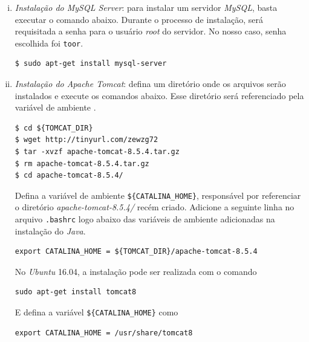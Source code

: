 \begin {enumerate}[i.]
\begin{lstlisting}[keywordstyle=\ttfamily, style=nonumbers]
export JAVA_HOME=/usr/lib/jvm/java-8-openjdk-amd64
export JRE_HOME=${JAVA_HOME}/jre
\end{lstlisting}

\item \textit{Instalação do MySQL Server}: para instalar um servidor
\textit{MySQL}, basta executar o comando abaixo. Durante o processo de
instalação, será requisitada a senha para o usuário \textit{root} do servidor.
No nosso caso, senha escolhida foi \texttt{toor}.
\begin{lstlisting}[keywordstyle=\ttfamily, style=nonumbers]
$ sudo apt-get install mysql-server
\end{lstlisting}


\item \textit{Instalação do Apache Tomcat}: defina um diretório onde os arquivos
serão instalados e execute os comandos abaixo. Esse diretório será referenciado
pela variável de ambiente .

\begin{lstlisting}[keywordstyle=\ttfamily, style=nonumbers]
$ cd ${TOMCAT_DIR}
$ wget http://tinyurl.com/zewzg72
$ tar -xvzf apache-tomcat-8.5.4.tar.gz
$ rm apache-tomcat-8.5.4.tar.gz
$ cd apache-tomcat-8.5.4/
\end{lstlisting}

Defina a variável de ambiente \texttt{\$\{CATALINA\_HOME\}}, responsável
por referenciar o diretório \textit{apache-tomcat-8.5.4/} recém criado. Adicione
a seguinte linha no arquivo \texttt{.bashrc} logo abaixo das variáveis de ambiente
adicionadas na instalação do \textit{Java}.

\begin{lstlisting}[keywordstyle=\ttfamily, style=nonumbers]
export CATALINA_HOME = ${TOMCAT_DIR}/apache-tomcat-8.5.4
\end{lstlisting}

No \textit{Ubuntu} 16.04, a instalação pode ser realizada com o comando 

\begin{lstlisting}[keywordstyle=\ttfamily, style=nonumbers]
sudo apt-get install tomcat8
\end{lstlisting}

E defina a variável \texttt{\$\{CATALINA\_HOME\}} como 

\begin{lstlisting}[keywordstyle=\ttfamily, style=nonumbers]
export CATALINA_HOME = /usr/share/tomcat8
\end{lstlisting}


\end{enumerate}
